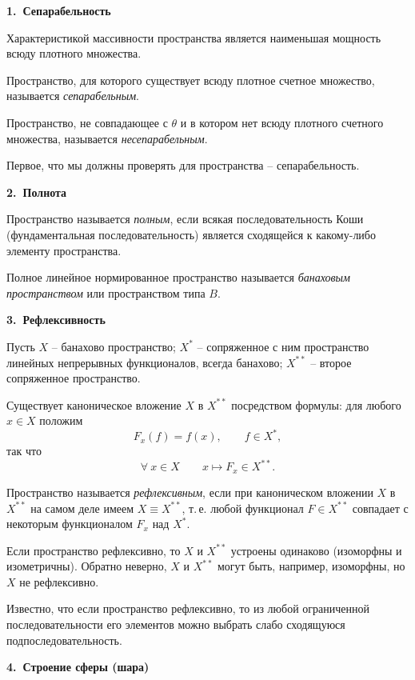 {\bf 1.~Сепарабельность}
\vspace{3mm}

Характеристикой массивности пространства является
 наименьшая мощность всюду плотного множества.

 Пространство, для которого существует всюду
 плотное счетное множество, называется {\it сепарабельным}.

 Пространство, не совпадающее с $\theta$ и в котором нет всюду
 плотного счетного множества, называется {\it несепарабельным}.

 Первое, что мы должны проверять для пространства -- сепарабельность.

\vspace{5mm}
{\bf 2.~Полнота}
\vspace{5mm}

Пространство называется {\it полным}, если всякая последовательность
 Коши (фундаментальная последовательность) является сходящейся к
 какому-либо элементу пространства.

 Полное линейное нормированное пространство
 называется {\it банаховым пространством} или пространством
 типа $B.$

\vspace{5mm}
{\bf 3.~Рефлексивность}
\vspace{5mm}

Пусть $X$ -- банахово пространство; $X^*$ -- сопряженное с ним
 пространство линейных непрерывных функционалов, всегда банахово; $X^{**}$ -- второе
 сопряженное пространство.

 Существует каноническое вложение $X$ в $X^{**}$ посредством формулы:
 {для любого} {$x\in X$ положим}
 $$
 F_{{x}}(f)=f(x),\qquad f\in X^*,
 $$
 так что
 $$
 \forall\ x\in X\qquad x\longmapsto F_{{x}}\in X^{**}.
 $$

 Пространство называется {\it рефлексивным}, если при
 каноническом вложении $X$ в $X^{**}$ на самом деле имеем $X\equiv X^{**}$,
 {т.\,е. любой функционал}
 {$F\in X^{**}$ совпадает с некоторым функционалом}
 {$F_x$ над $X^*$.}

 Если пространство рефлексивно, то $X$ и $X^{**}$ устроены одинаково (изоморфны и изометричны).
 Обратно неверно, $X$ и $X^{**}$ могут быть, например, изоморфны, но
 $X$ не рефлексивно.

 Известно, что если  пространство рефлексивно,
 то из любой ограниченной последовательности
 его элементов можно выбрать слабо сходящуюся подпоследовательность.

\vspace{5mm}
 {\bf 4.~Строение сферы (шара)}
 \vspace{5mm}

